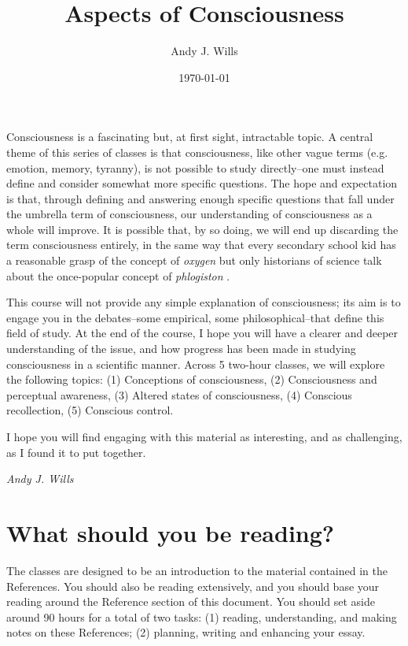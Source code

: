 \documentclass[11pt]{article}
\begin{document}
\title{Aspects of Consciousness}
\author{Andy J. Wills}
\date{\today}
\maketitle

Consciousness is a fascinating but, at first sight, intractable
topic. A central theme of this series of classes is that
consciousness, like other vague terms (e.g. emotion, memory, tyranny),
is not possible to study directly--one must instead define and
consider somewhat more specific questions. The hope and expectation is
that, through defining and answering enough specific questions that
fall under the umbrella term of consciousness, our understanding of
consciousness as a whole will improve.  It is possible that, by so
doing, we will end up discarding the term consciousness entirely, in
the same way that every secondary school kid has a reasonable grasp of
the concept of \emph{oxygen} but only historians of science talk about
the once-popular concept of \emph{phlogiston} \cite{phlogiston}.

This course will not provide any simple explanation of consciousness;
its aim is to engage you in the debates--some empirical, some
philosophical--that define this field of study. At the end of the
course, I hope you will have a clearer and deeper understanding of the
issue, and how progress has been made in studying consciousness in a
scientific manner. Across 5 two-hour classes, we will explore the
following topics: (1) Conceptions of consciousness, (2) Consciousness
and perceptual awareness, (3) Altered states of consciousness, (4)
Conscious recollection, (5) Conscious control.

I hope you will find engaging with this material as interesting, and
as challenging, as I found it to put together.

\begin{flushright}
	\emph{Andy J. Wills}
\end{flushright}

\section*{What should you be reading?}

The classes are designed to be an introduction to the material contained in the
References. You should also be reading extensively, and you should base your
reading around the Reference section of this document. You should set aside
around 90 hours for a total of two tasks: (1) reading, understanding, and
making notes on these References; (2) planning, writing and enhancing your
essay.
\end{document}
